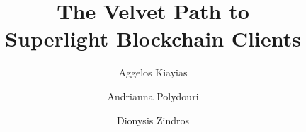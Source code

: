 \title{The Velvet Path to\\Superlight Blockchain Clients}
\ifanonymous{\iflncs
\author{}\institute{}
\fi}
\else
\author{
        Aggelos Kiayias \and
        Andrianna Polydouri \and
        Dionysis Zindros
}
\fi

\iflncs
\maketitle

\iftoday
\noindent
\makebox[\linewidth]{\today}
\fi
\fi
